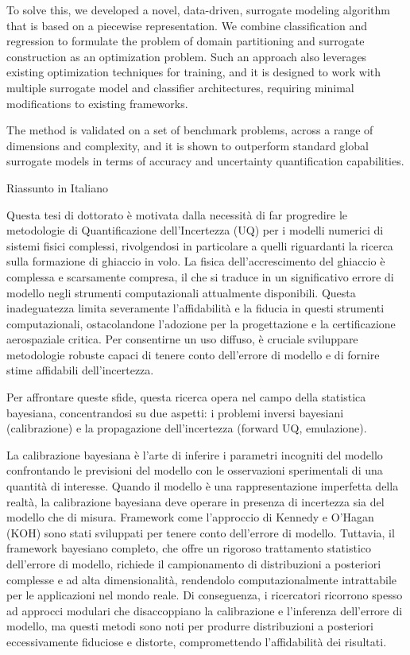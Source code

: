 To solve this, we developed a novel, data-driven, surrogate modeling algorithm that is based on a piecewise representation. We combine classification and regression to formulate the problem of domain partitioning and surrogate construction as an optimization problem. Such an approach also leverages existing optimization techniques for training, and it is designed to work with multiple surrogate model and classifier architectures, requiring minimal modifications to existing frameworks. 

The method is validated on a set of benchmark problems, across a range of dimensions and complexity, and it is shown to outperform standard global surrogate models in terms of accuracy and uncertainty quantification capabilities.

\bigskip
{Riassunto in Italiano}
\label{sec:abstract-it}

Questa tesi di dottorato \`e motivata dalla necessit\`a di far progredire le metodologie di Quantificazione dell'Incertezza (UQ) per i modelli numerici di sistemi fisici complessi, rivolgendosi in particolare a quelli riguardanti la ricerca sulla formazione di ghiaccio in volo. La fisica dell'accrescimento del ghiaccio \`e complessa e scarsamente compresa, il che si traduce in un significativo errore di modello negli strumenti computazionali attualmente disponibili. Questa inadeguatezza limita severamente l'affidabilit\`a e la fiducia in questi strumenti computazionali, ostacolandone l'adozione per la progettazione e la certificazione aerospaziale critica. Per consentirne un uso diffuso, \`e cruciale sviluppare metodologie robuste capaci di tenere conto dell'errore di modello e di fornire stime affidabili dell'incertezza.

\smallskip
Per affrontare queste sfide, questa ricerca opera nel campo della statistica bayesiana, concentrandosi su due aspetti: i problemi inversi bayesiani (calibrazione) e la propagazione dell'incertezza (forward UQ, emulazione).

\smallskip
La calibrazione bayesiana \`e l'arte di inferire i parametri incogniti del modello confrontando le previsioni del modello con le osservazioni sperimentali di una quantit\`a di interesse. Quando il modello \`e una rappresentazione imperfetta della realt\`a, la calibrazione bayesiana deve operare in presenza di incertezza sia del modello che di misura. Framework come l'approccio di Kennedy e O'Hagan (KOH) sono stati sviluppati per tenere conto dell'errore di modello. Tuttavia, il framework bayesiano completo, che offre un rigoroso trattamento statistico dell'errore di modello, richiede il campionamento di distribuzioni a posteriori complesse e ad alta dimensionalit\`a, rendendolo computazionalmente intrattabile per le applicazioni nel mondo reale. Di conseguenza, i ricercatori ricorrono spesso ad approcci modulari che disaccoppiano la calibrazione e l'inferenza dell'errore di modello, ma questi metodi sono noti per produrre distribuzioni a posteriori eccessivamente fiduciose e distorte, compromettendo l'affidabilit\`a dei risultati.

